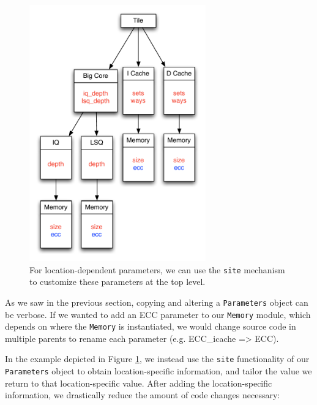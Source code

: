 \documentclass[10pt,twocolumn]{article}
\def\code#1{{\small\tt #1}}
\begin{document}
\begin{figure}[h]
\centering
\includegraphics[width=3in]{figs/ex4.pdf}
\caption{For location-dependent parameters, we can use the \code{site} mechanism to customize these parameters at the top level.}
\label{fig:ex4}
\end{figure}

As we saw in the previous section, copying and altering a \code{Parameters} object can be verbose. If we wanted to add an ECC parameter to our \code{Memory} module, which depends on where the \code{Memory} is instantiated, we would change source code in multiple parents to rename each parameter (e.g. ECC\_icache => ECC).

In the example depicted in Figure \ref{fig:ex4}, we instead use the \code{site} functionality of our \code{Parameters} object to obtain location-specific information, and tailor the value we return to that location-specific value. After adding the location-specific information, we drastically reduce the amount of code changes necessary:
\end{document}
